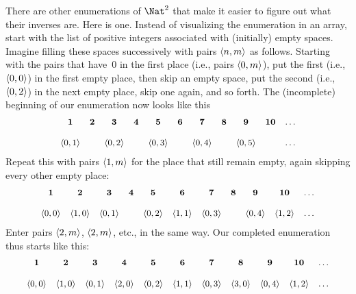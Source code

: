 \documentclass[../../../include/open-logic-section]{subfiles}
\begin{document}


\begin{explain}
There are other enumerations of $\Nat^2$ that make it easier to
figure out what their inverses are. Here is one. Instead of
visualizing the enumeration in an array, start with the list of
positive integers associated with (initially) empty spaces. Imagine
filling these spaces successively with pairs $\langle n,m \rangle$ as follows.
Starting with the pairs that have~$0$ in  the first place (i.e., pairs
$\langle 0,m \rangle$), put the first (i.e., $\langle 0,0 \rangle$) in the first empty
place, then skip an empty space, put the second (i.e., $\langle 0,2 \rangle$)
in the next empty place, skip one again, and so forth. The
(incomplete) beginning of our enumeration now looks like this
\[\small
\begin{array}{@{}c c c c c c c c c c c@{}}
\mathbf 1 & \mathbf 2 & \mathbf 3 & \mathbf 4 & \mathbf 5 & \mathbf 6 & \mathbf 7 & \mathbf 8 & \mathbf 9 & \mathbf{10} & \dots \\ \\
\tuple{0,1} &  & \tuple{0,2} &  & \tuple{0,3} & & \tuple{0,4} &  & \tuple{0,5} &  & \dots \\
\end{array}
\]
Repeat this with pairs $\langle 1,m \rangle$ for the place that still remain
empty, again skipping every other empty place:
\[\small
\begin{array}{@{}c c c c c c c c c c c@{}}
\mathbf 1 & \mathbf 2 & \mathbf 3 & \mathbf 4 & \mathbf 5 & \mathbf 6 & \mathbf 7 & \mathbf 8 & \mathbf 9 & \mathbf{10} & \dots \\ \\
\tuple{0,0} & \tuple{1,0} & \tuple{0,1} &  & \tuple{0,2} & \tuple{1,1} & 
\tuple{0,3} & & \tuple{0,4} &  \tuple{1,2} & \dots \\
\end{array}
\]
Enter pairs $\langle 2,m \rangle$, $\langle 2,m \rangle$, etc., in the same way. Our
completed enumeration thus starts like this:
\[\small
\begin{array}{@{}cc c c c c c c c c c@{}}
\mathbf 1 & \mathbf 2 & \mathbf 3 & \mathbf 4 & \mathbf 5 & \mathbf 6 & \mathbf 7 & \mathbf 8 & \mathbf 9 & \mathbf{10} & \dots \\ \\
\tuple{0,0} & \tuple{1,0} & \tuple{0,1} & \tuple{2,0}  & \tuple{0,2} & 
\tuple{1,1} & \tuple{0,3} & \tuple{3,0}  & \tuple{0,4} &  \tuple{1,2} & \dots \\

\end{array}\]
\end{explain}
\end{document}
